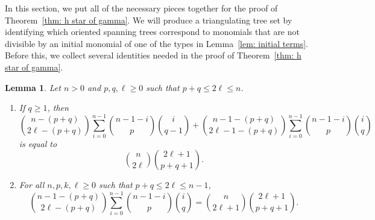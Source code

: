 \documentclass{amsart}
\numberwithin{equation}{section}
\theoremstyle{plain}
\newtheorem{lem}[thm]{Lemma}
\theoremstyle{definition}
\begin{document}
In this section, we put all of the necessary pieces together for the proof of Theorem~\ref{thm: h star of gamma}. 
We will produce a triangulating tree set by identifying which oriented spanning trees correspond to monomials that are not divisible by an initial monomial of one of the types in Lemma~\ref{lem: initial terms}.
Before this, we collect several identities needed in the proof of Theorem~\ref{thm: h star of gamma}.

\begin{lem}\label{lem: breaking up coefficient}
    Let $n > 0$ and $p,q,\ell \geq 0$ such that $p+q \leq 2\ell \leq n$.
    \begin{enumerate}[label={\rm (\roman*)}]
        \item If $q \geq 1$, then
        \[
            \binom{n-(p+q)}{2\ell-(p+q)}\sum_{i=0}^{n-1} \binom{n-1-i}{p}\binom{i}{q-1} + \binom{n-1-(p+q)}{2\ell-1-(p+q)}\sum_{i=0}^{n-1} \binom{n-1-i}{p}\binom{i}{q}
         \]
         is equal to
        \[
            \binom{n}{2\ell}\binom{2\ell + 1}{p+q + 1}.
       \]
        \item For all $n,p,k,\ell \geq 0$ such that $p+q \leq 2\ell \leq n-1$,
        \[
            \binom{n-1-(p+q)}{2\ell-(p+q)}\sum_{i=0}^{n-1} \binom{n-1-i}{p}\binom{i}{q}= \binom{n}{2\ell+1}\binom{2\ell+1}{p+q+1}.
        \]
    \end{enumerate}
\end{lem}
\end{document}
